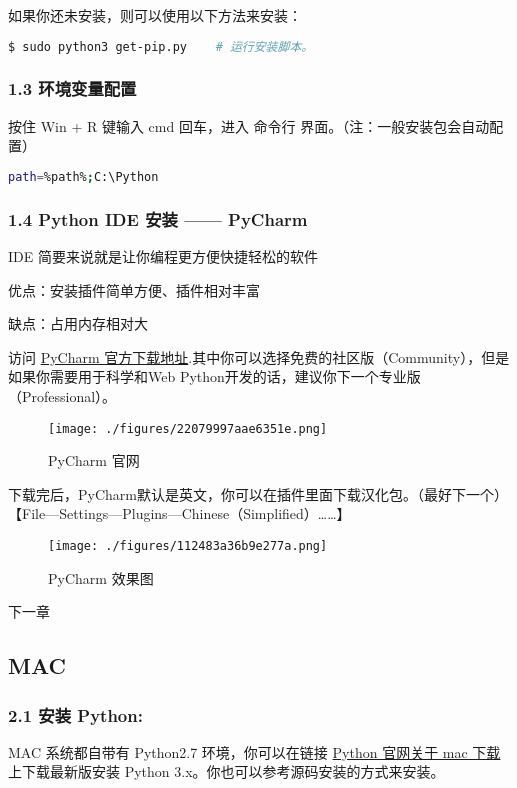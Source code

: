 如果你还未安装，则可以使用以下方法来安装：

\begin{lstlisting}[language=bash]
$ sudo python3 get-pip.py    # 运行安装脚本。
\end{lstlisting}

\subsubsection{1.3 环境变量配置}

按住 Win + R 键输入 cmd 回车，进入 命令行 界面。（注：一般安装包会自动配置）

\begin{lstlisting}[language=bash]
path=%path%;C:\Python 
\end{lstlisting}

\subsubsection{1.4 Python IDE 安装 —— PyCharm}

IDE 简要来说就是让你编程更方便快捷轻松的软件

优点：安装插件简单方便、插件相对丰富

缺点：占用内存相对大

访问 \href{http://www.jetbrains.com/pycharm/download/}{PyCharm 官方下载地址}.其中你可以选择免费的社区版（Community），但是如果你需要用于科学和Web Python开发的话，建议你下一个专业版（Professional）。

\begin{figure}[ht]
\centering
\texttt{[image: ./figures/22079997aae6351e.png]}
\caption{PyCharm 官网} \label{fig_PyIDE_1}
\end{figure}

下载完后，PyCharm默认是英文，你可以在插件里面下载汉化包。（最好下一个）【File—Settings—Plugins—Chinese（Simplified）……】

\begin{figure}[ht]
\centering
\texttt{[image: ./figures/112483a36b9e277a.png]}
\caption{PyCharm 效果图} \label{fig_PyIDE_2}
\end{figure}

下一章 

\subsection{MAC}\label{sub_Pyc1_2}

\subsubsection{2.1 安装 Python:}
MAC 系统都自带有 Python2.7 环境，你可以在链接 \href{https://www.python.org/downloads/mac-osx/}{Python 官网关于 mac 下载} 上下载最新版安装 Python 3.x。你也可以参考源码安装的方式来安装。

